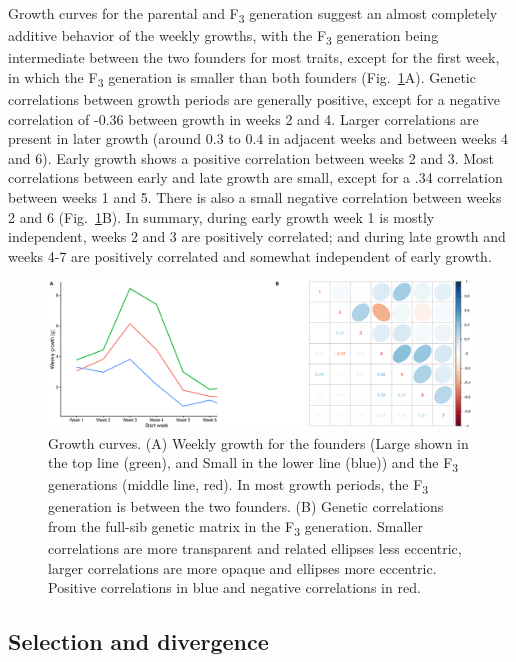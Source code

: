 \begin{refsection}
Growth curves for the parental and F\textsubscript{3} generation suggest
an almost completely additive behavior of the weekly growths, with the
F\textsubscript{3} generation being intermediate between the two
founders for most traits, except for the first week, in which the
F\textsubscript{3} generation is smaller than both founders (Fig.~\ref{fig:joh:growth}A).
Genetic correlations between growth periods are generally positive,
except for a negative correlation of -0.36 between growth in weeks 2 and
4. Larger correlations are present in later growth (around 0.3 to 0.4 in
adjacent weeks and between weeks 4 and 6). Early growth shows a positive
correlation between weeks 2 and 3. Most correlations between early and
late growth are small, except for a .34 correlation between weeks 1 and
5. There is also a small negative correlation between weeks 2 and 6 (Fig.~\ref{fig:joh:growth}B).
In summary, during early growth week 1 is mostly
independent, weeks 2 and 3 are positively correlated; and during late
growth and weeks 4-7 are positively correlated and somewhat independent
of early growth.

\begin{figure}
\includegraphics[width=\linewidth]{chapter_JoH-Melo_etal/media/growth_LG_SM_F3_covF3.eps}
\caption[Growth curves]{Growth curves. (A) Weekly growth for the founders (Large
shown in the top line (green), and Small in the lower line (blue)) and the
F\textsubscript{3} generations (middle line, red). In most growth periods,
the F\textsubscript{3} generation is between the two founders. (B)
Genetic correlations from the full-sib genetic matrix in the
F\textsubscript{3} generation. Smaller correlations are more transparent
and related ellipses less eccentric, larger correlations are more opaque
and ellipses more eccentric. Positive correlations in blue and negative
correlations in red.}
\label{fig:joh:growth}
\end{figure}

\subsection{Selection and divergence}


\end{refsection}
